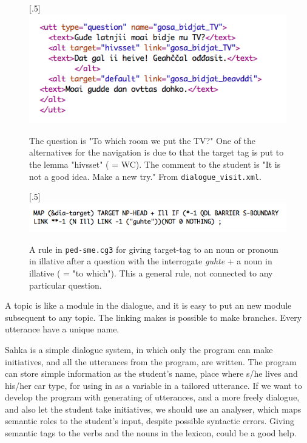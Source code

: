 \documentclass[a4paper,12pt]{article}
\begin{document}
\begin{figure}[htbp]
\begin{center}
\scalebox{.5}[.5]{\includegraphics{presentation/img/gosabidjatTV.png}}
\caption{The question is "To which room we put the TV?" One of the alternatives for the navigation is due to that the target tag is put to the lemma "hivsset" ( = WC). The comment to the student is "It is not a good idea. Make a new try." From \texttt{dialogue\_visit.xml}.}
\label{TV}
\end{center}
\end{figure}


\begin{figure}[htbp]
\begin{center}
\scalebox{.5}[.5]{\includegraphics{presentation/img/targetIll.png}}
\caption{A rule in \texttt{ped-sme.cg3} for giving target-tag to an noun or pronoun in illative after a question with the interrogate \textit{guhte} + a noun in illative ( = "to which"). This a general rule, not connected to any particular question.}
\label{targetIll}
\end{center}
\end{figure}

\newpage
A topic is like a module in the dialogue, and it is easy to put an new module subsequent to any topic. The linking makes is possible to make branches. Every utterance have a unique name.  

Sahka is a simple dialogue system, in which only the program can make initiatives, and all the utterances from the program, are written. The program can store simple information as the student's name, place where s/he lives and his/her car type, for using in as a variable in a tailored utterance. If we want to develop the program with generating of utterances, and a more freely dialogue, and also let the student take initiatives, we should use an analyser, which maps semantic roles to the student's input, despite possible syntactic errors. Giving semantic tags to the verbs and the nouns in the lexicon, could be a good help. 
\end{document}
